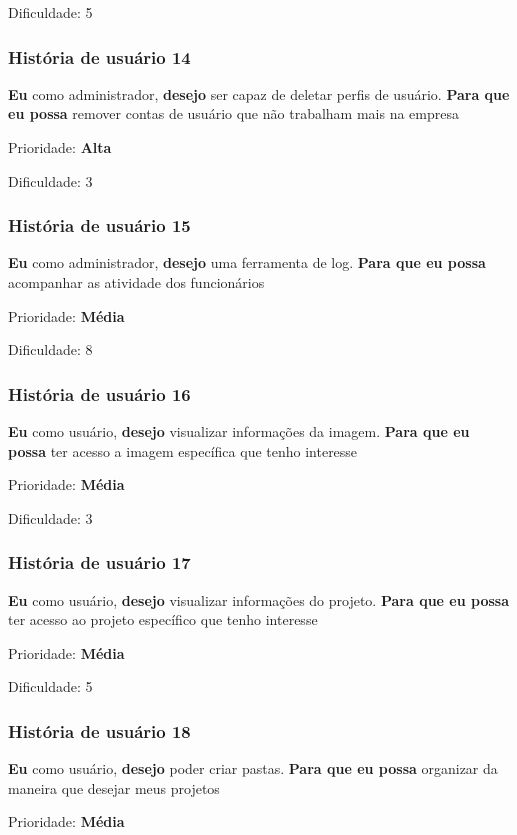     Dificuldade: 5

  \subsubsection{História de usuário 14}
    \textbf{Eu} como administrador, \textbf{desejo} ser capaz de deletar perfis de usuário. \textbf{Para que eu possa} remover contas de usuário que não trabalham mais na empresa

    Prioridade: \textbf{Alta}

    Dificuldade: 3

  \subsubsection{História de usuário 15}
    \textbf{Eu} como administrador, \textbf{desejo} uma ferramenta de log. \textbf{Para que eu possa} acompanhar as atividade dos funcionários 

    Prioridade: \textbf{Média}

    Dificuldade: 8

  \subsubsection{História de usuário 16}
    \textbf{Eu} como usuário, \textbf{desejo} visualizar informações da imagem. \textbf{Para que eu possa} ter acesso a imagem específica que tenho interesse

    Prioridade: \textbf{Média}

    Dificuldade: 3

  \subsubsection{História de usuário 17}
    \textbf{Eu} como usuário, \textbf{desejo} visualizar informações do projeto. \textbf{Para que eu possa} ter acesso ao projeto específico que tenho interesse

    Prioridade: \textbf{Média}

    Dificuldade: 5

  \subsubsection{História de usuário 18}
    \textbf{Eu} como usuário, \textbf{desejo} poder criar pastas. \textbf{Para que eu possa} organizar da maneira que desejar meus projetos

    Prioridade: \textbf{Média}

